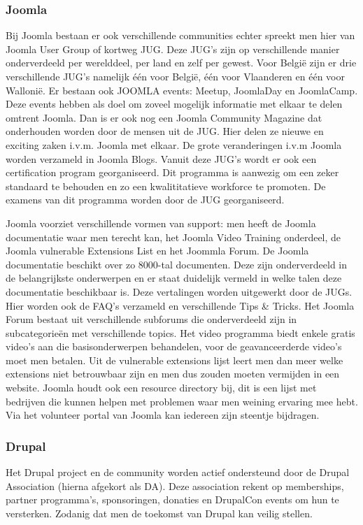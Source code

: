 \subsubsection{Joomla}
Bij Joomla bestaan er ook verschillende communities echter spreekt men hier van Joomla User Group of kortweg JUG. Deze JUG's zijn op verschillende manier onderverdeeld per werelddeel, per land en zelf per gewest. Voor België zijn er drie verschillende JUG's namelijk één voor België, één voor Vlaanderen en één voor Wallonië. Er bestaan ook JOOMLA events: Meetup, JoomlaDay en JoomlaCamp. Deze events hebben als doel om zoveel mogelijk informatie met  elkaar te delen omtrent Joomla. Dan is er ook nog een Joomla Community Magazine dat onderhouden worden door de mensen uit de JUG. Hier delen ze nieuwe en exciting zaken i.v.m. Joomla met elkaar. De grote veranderingen i.v.m Joomla worden verzameld in Joomla Blogs. Vanuit deze JUG's wordt er ook een certification program georganiseerd. Dit programma is aanwezig om een zeker standaard te behouden en zo een kwalititatieve workforce te promoten. De examens van dit programma worden door de JUG georganiseerd.

Joomla voorziet verschillende vormen van support: men heeft de Joomla documentatie waar men terecht kan, het Joomla Video Training onderdeel, de Joomla vulnerable Extensions List en het Joommla Forum. De Joomla documentatie beschikt over zo 8000-tal documenten. Deze zijn onderverdeeld in de belangrijkste onderwerpen en er staat duidelijk vermeld in welke talen deze documentatie beschikbaar is. Deze vertalingen worden uitgewerkt door de JUGs. Hier worden ook de FAQ's verzameld en verschillende Tips \& Tricks. Het Joomla Forum bestaat uit verschillende subforums die onderverdeeld zijn in subcategorieën met verschillende topics. Het video programma biedt enkele gratis video's aan die basisonderwerpen behandelen, voor de geavanceerderde video's moet men betalen. Uit de vulnerable extensions lijst leert men dan meer welke extensions niet betrouwbaar zijn en men dus zouden moeten vermijden in een website. Joomla houdt ook een resource directory bij, dit is een lijst met bedrijven die kunnen helpen met problemen waar men weining ervaring mee hebt. Via het volunteer portal van Joomla kan iedereen zijn steentje bijdragen.



\subsubsection{Drupal}
Het Drupal project en de community worden actief ondersteund door de Drupal Association (hierna afgekort als DA). Deze association rekent op memberships, partner programma's, sponsoringen, donaties en DrupalCon events om hun te versterken. Zodanig dat men de toekomst van Drupal kan veilig stellen. 

